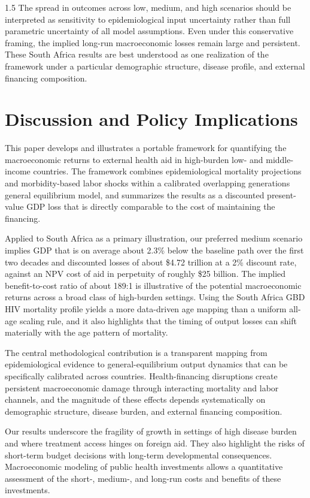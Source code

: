 \documentclass[letterpaper,12pt]{article}
\theoremstyle{definition}
\begin{document}
\begin{spacing}{1.5}
The spread in outcomes across low, medium, and high scenarios should be interpreted as sensitivity to epidemiological input uncertainty rather than full parametric uncertainty of all model assumptions. Even under this conservative framing, the implied long-run macroeconomic losses remain large and persistent. These South Africa results are best understood as one realization of the framework under a particular demographic structure, disease profile, and external financing composition.

\section{Discussion and Policy Implications}\label{SecDiscussion}

This paper develops and illustrates a portable framework for quantifying the macroeconomic returns to external health aid in high-burden low- and middle-income countries. The framework combines epidemiological mortality projections and morbidity-based labor shocks within a calibrated overlapping generations general equilibrium model, and summarizes the results as a discounted present-value GDP loss that is directly comparable to the cost of maintaining the financing.

Applied to South Africa as a primary illustration, our preferred medium scenario implies GDP that is on average about 2.3\% below the baseline path over the first two decades and discounted losses of about \$4.72 trillion at a 2\% discount rate, against an NPV cost of aid in perpetuity of roughly \$25 billion. The implied benefit-to-cost ratio of about 189:1 is illustrative of the potential macroeconomic returns across a broad class of high-burden settings. Using the South Africa GBD HIV mortality profile yields a more data-driven age mapping than a uniform all-age scaling rule, and it also highlights that the timing of output losses can shift materially with the age pattern of mortality.

The central methodological contribution is a transparent mapping from epidemiological evidence to general-equilibrium output dynamics that can be specifically calibrated across countries. Health-financing disruptions create persistent macroeconomic damage through interacting mortality and labor channels, and the magnitude of these effects depends systematically on demographic structure, disease burden, and external financing composition.

Our results underscore the fragility of growth in settings of high disease burden and where treatment access hinges on foreign aid. They also highlight the risks of short-term budget decisions with long-term developmental consequences. Macroeconomic modeling of public health investments allows a quantitative assessment of the short-, medium-, and long-run costs and benefits of these investments.


\end{spacing}
\end{document}

